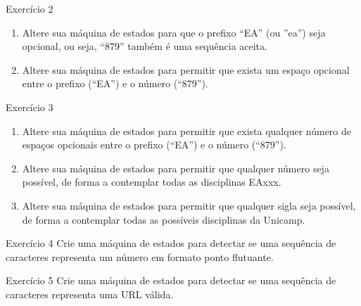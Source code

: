 \documentclass{beamer}
\begin{document}
\begin{frame}[fragile]{Exercício 2}
  \centering
  \large
  \begin{enumerate}
    \item Altere sua máquina de estados para que o prefixo ``EA'' (ou ''ea'')
      seja opcional, ou seja, ``879'' também é uma sequência aceita.
    \item Altere sua máquina de estados para permitir que exista um espaço
      opcional entre o prefixo (``EA'') e o número (``879'').
  \end{enumerate}
\end{frame}

\begin{frame}[fragile]{Exercício 3}
  \centering
  \large
  \begin{enumerate}
    \item Altere sua máquina de estados para permitir que exista qualquer número
      de espaços opcionais entre o prefixo (``EA'') e o número (``879'').
    \item Altere sua máquina de estados para permitir que qualquer número seja
      possível, de forma a contemplar todas as disciplinas EAxxx.
    \item Altere sua máquina de estados para permitir que qualquer sigla seja
      possível, de forma a contemplar todas as possíveis disciplinas da Unicamp.
  \end{enumerate}
\end{frame}

\begin{frame}[fragile]{Exercício 4}
  \centering
  \large
  Crie uma máquina de estados para detectar se uma sequência de caracteres
  representa um número em formato ponto flutuante.
\end{frame}

\begin{frame}[fragile]{Exercício 5}
  \centering
  \large
  Crie uma máquina de estados para detectar se uma sequência de caracteres
  representa uma URL válida.
\end{frame}
\end{document}
